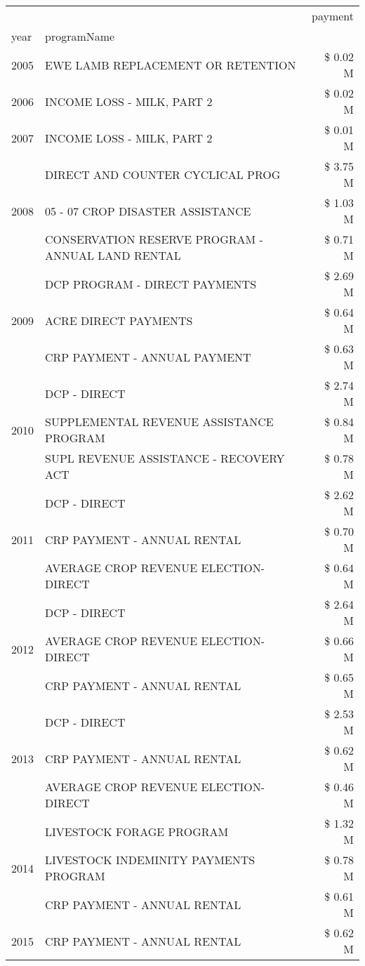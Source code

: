 \begin{tabular}{llr}
\toprule
 &  & payment \\
year & programName &  \\
\midrule
2005 & EWE LAMB REPLACEMENT OR RETENTION & \$ 0.02 M \\
\cline{1-3}
2006 & INCOME LOSS - MILK, PART 2 & \$ 0.02 M \\
\cline{1-3}
2007 & INCOME LOSS - MILK, PART 2 & \$ 0.01 M \\
\cline{1-3}
\multirow[t]{3}{*}{2008} & DIRECT AND COUNTER CYCLICAL PROG & \$ 3.75 M \\
 & 05 - 07 CROP DISASTER ASSISTANCE & \$ 1.03 M \\
 & CONSERVATION RESERVE PROGRAM - ANNUAL LAND RENTAL & \$ 0.71 M \\
\cline{1-3}
\multirow[t]{3}{*}{2009} & DCP PROGRAM - DIRECT PAYMENTS & \$ 2.69 M \\
 & ACRE DIRECT PAYMENTS & \$ 0.64 M \\
 & CRP PAYMENT - ANNUAL PAYMENT & \$ 0.63 M \\
\cline{1-3}
\multirow[t]{3}{*}{2010} & DCP - DIRECT & \$ 2.74 M \\
 & SUPPLEMENTAL REVENUE ASSISTANCE PROGRAM & \$ 0.84 M \\
 & SUPL REVENUE ASSISTANCE - RECOVERY ACT & \$ 0.78 M \\
\cline{1-3}
\multirow[t]{3}{*}{2011} & DCP - DIRECT & \$ 2.62 M \\
 & CRP PAYMENT - ANNUAL RENTAL & \$ 0.70 M \\
 & AVERAGE CROP REVENUE ELECTION-DIRECT & \$ 0.64 M \\
\cline{1-3}
\multirow[t]{3}{*}{2012} & DCP - DIRECT & \$ 2.64 M \\
 & AVERAGE CROP REVENUE ELECTION-DIRECT & \$ 0.66 M \\
 & CRP PAYMENT - ANNUAL RENTAL & \$ 0.65 M \\
\cline{1-3}
\multirow[t]{3}{*}{2013} & DCP - DIRECT & \$ 2.53 M \\
 & CRP PAYMENT - ANNUAL RENTAL & \$ 0.62 M \\
 & AVERAGE CROP REVENUE ELECTION-DIRECT & \$ 0.46 M \\
\cline{1-3}
\multirow[t]{3}{*}{2014} & LIVESTOCK FORAGE PROGRAM & \$ 1.32 M \\
 & LIVESTOCK INDEMINITY PAYMENTS PROGRAM & \$ 0.78 M \\
 & CRP PAYMENT - ANNUAL RENTAL & \$ 0.61 M \\
\cline{1-3}
\multirow[t]{3}{*}{2015} & CRP PAYMENT - ANNUAL RENTAL & \$ 0.62 M \\

\end{tabular}
